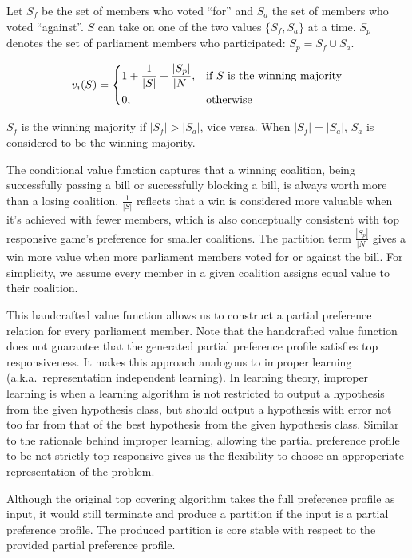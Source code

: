 Let $S_f$ be the set of members who voted ``for'' and
$S_a$ the set of members who voted ``against''.
$S$ can take on one of the two values $\{S_f, S_a\}$ at a time.
$S_p$ denotes the set of parliament members who participated: $S_p = S_f \cup S_a$.

\[
  v_i(S) =
  \begin{dcases}
      1 + \frac{1}{|S|} + \frac{|S_p|}{|N|},& \text{if $S$ is the winning majority}\\
      0,              & \text{otherwise}
  \end{dcases}
\]

$S_f$ is the winning majority if $|S_f| > |S_a|$, vice versa. When $|S_f| = |S_a|$, $S_a$ is considered to be the winning majority.

The conditional value function captures that a winning coalition,
being successfully passing a bill or successfully blocking a bill,
is always worth more than a losing coalition.
$\frac{1}{|S|}$ reflects that a win is considered more valuable when it's
achieved with fewer members, which is also conceptually consistent with
top responsive game's preference for smaller coalitions.
The partition term $\frac{|S_p|}{|N|}$ gives a win more value when more
parliament members voted for or against the bill.
For simplicity, we assume every member in a given coalition assigns
equal value to their coalition.

This handcrafted value function allows us to construct a partial preference
relation for every parliament member.
Note that the handcrafted value function does not guarantee that the generated partial preference profile satisfies top responsiveness.
It makes this approach analogous to improper learning (a.k.a.\ representation independent learning).
In learning theory, improper learning is when a learning algorithm is not
restricted to output a hypothesis from the given hypothesis class,
but should output a hypothesis with error not too far from that of
the best hypothesis from the given hypothesis class.
Similar to the rationale behind improper learning, allowing the
partial preference profile to be not strictly top responsive gives us
the flexibility to choose an approperiate representation of the problem.

Although the original top covering algorithm takes the full preference
profile as input, it would still terminate and produce a partition
if the input is a partial preference profile.
The produced partition is core stable with respect to the provided partial
preference profile.

